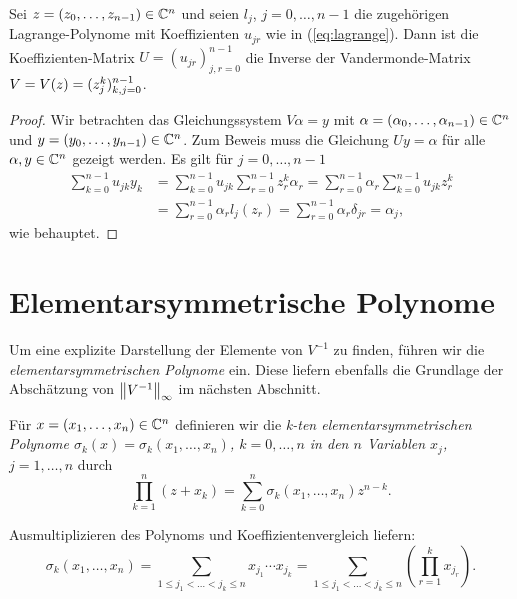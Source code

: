 \begin{lemma}
    Sei $z = (z_0, \dots, z_{n-1}) \in \mathbb{C}^n$ und seien
    $l_j$, $j = 0, \dots, n-1$ die zugehörigen Lagrange-Polynome
    mit Koeffizienten $u_{jr}$ wie in (\ref{eq:lagrange}).
    Dann ist die Koeffizienten-Matrix $U = (u_{jr})_{j,r = 0}^{n-1}$ die
    Inverse der Vandermonde-Matrix $V = \text{$V(z)$} = (z_{j}^{k})_{k,j = 0}^{n-1}$.
\end{lemma}

\begin{proof}
    Wir betrachten das Gleichungssystem $V \alpha = y$ mit
    $\alpha = (\alpha_0, \dots, \alpha_{n-1}) \in \mathbb{C}^n$
    und $y = (y_0, \dots, y_{n-1}) \in \mathbb{C}^n$.
    Zum Beweis muss die Gleichung $U y = \alpha$ für alle $\alpha,  y \in \mathbb{C}^n$
    gezeigt werden.
    Es gilt für $j = 0, \dots, n-1$
    \[
        \begin{split}
            \sum_{k=0}^{n-1} u_{jk} y_k &= \sum_{k=0}^{n-1} u_{jk} \sum_{r=0}^{n-1} z_r^k \alpha_r = \sum_{r=0}^{n-1} \alpha_r \sum_{k=0}^{n-1} u_{jk} z_r^k\\
                                        &= \sum_{r=0}^{n-1} \alpha_r l_j(z_r) = \sum_{r=0}^{n-1} \alpha_r \delta_{jr} = \alpha_j,
        \end{split}
    \]
    wie behauptet.
\end{proof}

\section{Elementarsymmetrische Polynome}
Um eine explizite Darstellung der Elemente von $V^{-1}$ zu finden, führen wir
die \emph{elementarsymmetrischen Polynome} ein.
Diese liefern ebenfalls die Grundlage der Abschätzung von
$\left\lVert V^{-1} \right\rVert_\infty$ im nächsten Abschnitt.

\begin{mydef}
    Für $x = (x_1, \dots, x_{n}) \in \mathbb{C}^n$ definieren wir die
    \emph{k-ten elementarsymmetrischen Polynome
    $\sigma_{k}(x) = \sigma_{k}(x_1, \dots, x_{n})$, $k = 0, \dots, n$
    in den $n$ Variablen $x_j$, $j = 1, \dots, n$} durch
    \[
        \prod_{k=1}^{n} (z + x_k)
        = \sum_{k=0}^{n} \sigma_{k}(x_1, \dots, x_{n}) z^{n-k}.
    \]
\end{mydef}

\begin{remark}
    Ausmultiplizieren des Polynoms und Koeffizientenvergleich liefern:
    \begin{equation}
        \label{eq:explicit_elementary_symmetric_polynomials}
        \sigma_{k}(x_1, \dots, x_{n})
        = \sum_{1 \leq j_1 < \dots < j_k \leq n} x_{j_1} \cdots x_{j_k}
        = \sum_{1 \leq j_1 < \dots < j_k \leq n} \left( \prod_{r=1}^k x_{j_r} \right).
    \end{equation}
\end{remark}

